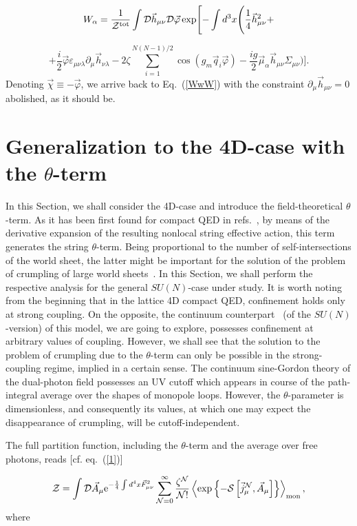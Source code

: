 \documentclass[a4paper,12pt]{article}
\begin{document}
$$W_\alpha=\frac{1}{{\cal Z}^{\rm tot}}
\int{\cal D}\vec h_{\mu\nu}{\cal D}\vec\varphi\exp\Biggl[-\int d^3x\Biggl(
\frac14\vec h_{\mu\nu}^2+$$

$$
+\frac{i}{2}\vec\varphi\varepsilon_{\mu\nu\lambda}\partial_\mu
\vec h_{\nu\lambda}-2\zeta\sum\limits_{i=1}^{N(N-1)/2}\cos\left(g_m\vec q_i\vec\varphi\right)
-\frac{ig}{2}\vec\mu_\alpha\vec h_{\mu\nu}\Sigma_{\mu\nu}\Biggr)\Biggr].$$
Denoting $\vec\chi\equiv-\vec\varphi$, we arrive back to Eq.~(\ref{WwW}) with the constraint $\partial_\mu\vec h_{\mu\nu}=0$ abolished, as it should be.







\section{Generalization to the 4D-case with the $\theta$-term}

In this Section, we shall consider the 4D-case and introduce the field-theoretical $\theta$-term.
As it has been first found for compact QED in refs.~\cite{cristina, tq}, by means of the derivative expansion of the resulting nonlocal string effective action,
this term generates the string $\theta$-term. Being proportional to the number of self-intersections of the world sheet,
the latter might be important for the solution of the problem of crumpling of large world sheets~\cite{dg}.
In this Section, we shall perform the respective analysis for the general $SU(N)$-case under study.
It is worth noting from the beginning that in the lattice 4D compact QED, confinement holds only at strong coupling. On the opposite,
the continuum counterpart~\cite{cristina, tq} (of the $SU(N)$-version) of this model, we are going to explore,
possesses confinement at arbitrary values of coupling. However, we shall see that the solution to the problem of crumpling
due to the $\theta$-term can only be possible in the strong-coupling regime, implied in a certain sense.
The continuum
sine-Gordon theory of the dual-photon field possesses an UV cutoff which appears in course of the path-integral average over the shapes of
monopole loops.
However, the $\theta$-parameter is dimensionless, and consequently its values,
at which one may expect the disappearance of crumpling, will be cutoff-independent.

The full partition function, including the $\theta$-term and the average over free photons, reads [cf. eq.~(\ref{1})]

\begin{equation}
\label{Z4D}
{\cal Z}=\int {\cal D}\vec A_\mu{\rm e}^{-\frac14\int d^4x\vec F_{\mu\nu}^2}\sum\limits_{{\cal N}=0}^{\infty}
\frac{\zeta^{\cal N}}{{\cal N}!}\left<\exp\left\{-{\cal S}\left[\vec j_\mu^{\cal N}, \vec A_\mu\right]\right\}\right>_{\rm mon},
\end{equation}
where
\end{document}
